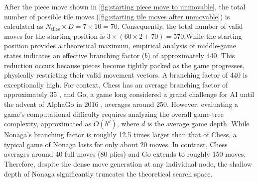 After the piece move shown in \cref{fig:starting piece move to unmovable}, the total number of possible tile moves (\cref{fig:starting tile moves after unmovable}) is calculated as $N_{\text{tiles}} \times D = 7 \times 10 = 70$. Consequently, the total number of valid moves for the starting position is $3 \times (60 \times 2 + 70) = 570$.While the starting position provides a theoretical maximum, empirical analysis of middle-game states indicates an effective branching factor ($b$) of approximately 440. This reduction occurs because pieces become tightly packed as the game progresses, physically restricting their valid movement vectors. A branching factor of 440 is exceptionally high. For context, Chess has an average branching factor of approximately 35 \cite{Artificial_intelligence}, and Go, a game long considered a grand challenge for AI until the advent of AlphaGo in 2016 \cite{Go_Paper}, averages around 250. However, evaluating a game's computational difficulty requires analyzing the overall game-tree complexity, approximated as $O(b^d)$, where $d$ is the average game depth. While Nonaga's branching factor is roughly 12.5 times larger than that of Chess, a typical game of Nonaga lasts for only about 20 moves. In contrast, Chess averages around 40 full moves (80 plies) and Go extends to roughly 150 moves. Therefore, despite the dense move generation at any individual node, the shallow depth of Nonaga significantly truncates the theoretical search space. 